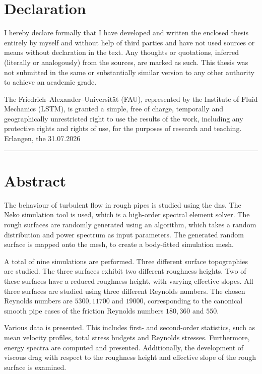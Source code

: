 \documentclass[
 	11pt,                 				%
  	notitlepage,          				%
  	twoside, 			   				%
 	bibliography=totoc,
  	listof=totoc,
  	headsepline,         				%
  	footsepline,         				%
  cleardoublepage=empty,				%
  numbers=noenddot,
]{scrreprt}
\begin{document}
\thispagestyle{empty}
\cleardoublepage

\setcounter{page}{1}
\chapter*{Declaration}

I hereby declare formally that I have developed and written the enclosed thesis entirely by myself and without help of third parties and have not used sources or means without declaration in the text. Any thoughts or quotations, inferred (literally or analogously) from the sources, are marked as such. This thesis was not submitted in the same or substantially similar version to any other authority to achieve an academic grade.

The Friedrich--Alexander--Universität (FAU), represented by the Institute of Fluid Mechanics (LSTM), is granted a simple, free of charge, temporally and geographically unrestricted right to use the results of the work, including any protective rights and rights of use, for the purposes of research and teaching.
\\ [35mm]
Erlangen, the 31.07.2026 \hspace{4cm} \rule{5cm}{0.02mm}

\chapter*{Abstract}
The behaviour of turbulent flow in rough pipes is studied using the \acrfull{dns}.
The Neko simulation tool is used, which is a high-order spectral element solver.
The rough surfaces are randomly generated using an algorithm, which takes a random distribution and power spectrum as input parameters.
The generated random surface is mapped onto the mesh, to create a body-fitted simulation mesh.

A total of nine simulations are performed.
Three different surface topographies are studied.
The three surfaces exhibit two different roughness heights.
Two of these surfaces have a reduced roughness height, with varying effective slopes.
All three surfaces are studied using three different Reynolds numbers.
The chosen Reynolds numbers are $5300, 11700$ and $19000$, corresponding to the canonical smooth pipe cases of the friction Reynolds numbers $180, 360$ and $550$.

Various data is presented.
This includes first- and second-order statistics, such as mean velocity profiles, total stress budgets and Reynolds stresses.
Furthermore, energy spectra are computed and presented.
Additionally, the development of viscous drag with respect to the roughness height and effective slope of the rough surface is examined.
\end{document}
